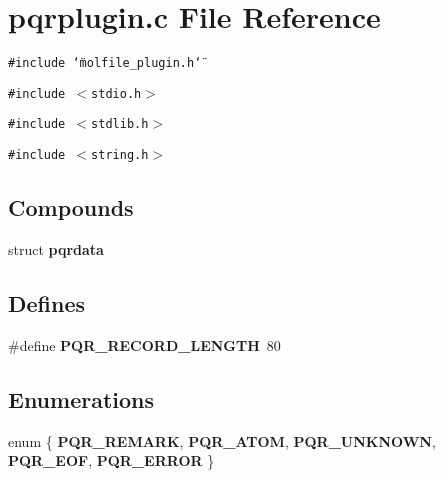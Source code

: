 \section{pqrplugin.c File Reference}
\label{pqrplugin_8c}
{\tt \#include \char`\"{}molfile\_\-plugin.h\char`\"{}}\par
{\tt \#include $<$stdio.h$>$}\par
{\tt \#include $<$stdlib.h$>$}\par
{\tt \#include $<$string.h$>$}\par
\subsection*{Compounds}
\begin{CompactItemize}
\item 
struct {\bf pqrdata}
\end{CompactItemize}
\subsection*{Defines}
\begin{CompactItemize}
\item 
\#define {\bf PQR\_\-RECORD\_\-LENGTH}\ 80
\end{CompactItemize}
\subsection*{Enumerations}
\begin{CompactItemize}
\item 
enum \{ {\bf PQR\_\-REMARK}, 
{\bf PQR\_\-ATOM}, 
{\bf PQR\_\-UNKNOWN}, 
{\bf PQR\_\-EOF}, 
{\bf PQR\_\-ERROR}
 \}
\end{CompactItemize}

